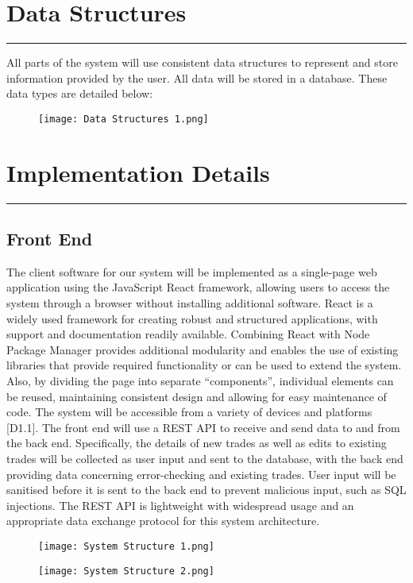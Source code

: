 \documentclass{article}
\begin{document}
\newpage
\section*{Data Structures}
\hrule
\vspace{9pt}
All parts of the system will use consistent data structures to represent and store information provided by the user. All data will be stored in a database. These data types are detailed below: 

\begin{figure}[h]
    \centering
    \texttt{[image: Data Structures 1.png]}
\end{figure}

\section*{Implementation Details}
\hrule
\vspace{18pt}

\subsection*{Front End}
The client software for our system will be implemented as a single-page web application using the JavaScript React framework, allowing users to access the system through a browser without installing additional software. React is a widely used framework for creating robust and structured applications, with support and documentation readily available. Combining React with Node Package Manager provides additional modularity and enables the use of existing libraries that provide required functionality or can be used to extend the system. Also,
by dividing the page into separate “components”, individual elements can be reused, maintaining consistent design and allowing for easy maintenance of code. The system will be accessible from a variety of devices and platforms [D1.1]. The front end will use a REST API to receive and send data to and from the back end. Specifically, the details of new trades as well as edits to existing trades will be collected as user input and sent to the database, with the back end providing data concerning error-checking and existing trades. User input
will be sanitised before it is sent to the back end to prevent malicious input, such as SQL injections.
The REST API is lightweight with widespread usage and an appropriate data exchange protocol for this system architecture.

\begin{figure}[h]
    \centering
    \texttt{[image: System Structure 1.png]}
\end{figure}
\begin{figure}[h]
    \centering
    \texttt{[image: System Structure 2.png]}
\end{figure}
\end{document}
